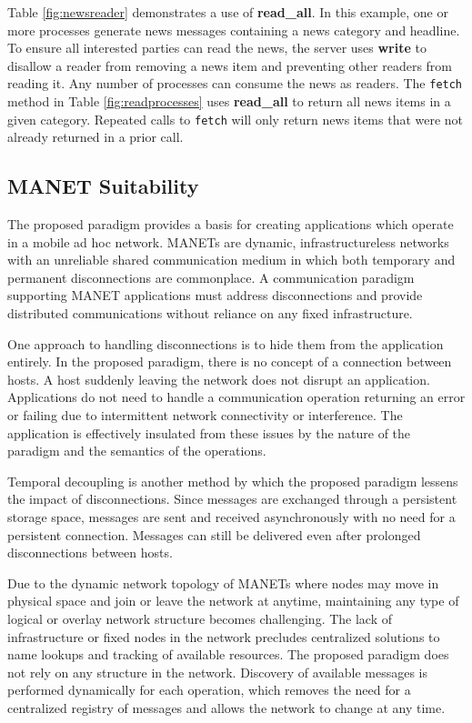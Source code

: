 \documentclass[lnicst]{svmultln}
\begin{document}
    Table \ref{fig:newsreader} demonstrates a use of \textbf{read\_all}. In this example, one or more processes generate news messages containing a news category and headline. To ensure all interested parties can read the news, the server uses \textbf{write} to disallow a reader from removing a news item and preventing other readers from reading it. Any number of processes can consume the news as readers. The \texttt{fetch} method in Table \ref{fig:readprocesses} uses \textbf{read\_all} to return all news items in a given category. Repeated calls to \texttt{fetch} will only return news items that were not already returned in a prior call.
    
\subsection{MANET Suitability}

The proposed paradigm provides a basis for creating applications which operate in a mobile ad hoc network. MANETs are dynamic, infrastructureless networks with an unreliable shared communication medium in which both temporary and permanent disconnections are commonplace. A communication paradigm supporting MANET applications must address disconnections and provide distributed communications without reliance on any fixed infrastructure.

One approach to handling disconnections is to hide them from the application entirely. In the proposed paradigm, there is no concept of a connection between hosts. A host suddenly leaving the network does not disrupt an application. Applications do not need to handle a communication operation returning an error or failing due to intermittent network connectivity or interference. The application is effectively insulated from these issues by the nature of the paradigm and the semantics of the operations.

Temporal decoupling is another method by which the proposed paradigm lessens the impact of disconnections. Since messages are exchanged through a persistent storage space, messages are sent and received asynchronously with no need for a persistent connection. Messages can still be delivered even after prolonged disconnections between hosts.

Due to the dynamic network topology of MANETs where nodes may move in physical space and join or leave the network at anytime, maintaining any type of logical or overlay network structure becomes challenging. The lack of infrastructure or fixed nodes in the network precludes centralized solutions to name lookups and tracking of available resources. The proposed paradigm does not rely on any structure in the network. Discovery of available messages is performed dynamically for each operation, which removes the need for a centralized registry of messages and allows the network to change at any time.
\end{document}
